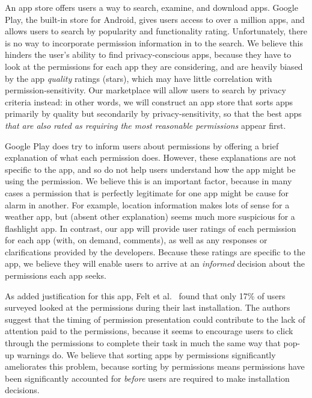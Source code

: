 \documentclass[11pt]{article}
\begin{document}
An app store offers users a way to search, examine, and download
apps.  Google Play, the built-in store for Android, gives
users access to over a million apps, and allows users to search by
popularity and functionality rating. Unfortunately, there is no way to incorporate
permission information in to the search. We believe this hinders the
user's ability to find privacy-conscious apps, because they have to
look at the permissions for each app they are considering, and are
heavily biased by the app \emph{quality} ratings (stars), which may
have little correlation with permission-sensitivity. Our marketplace
will allow users to search by privacy criteria instead: in other
words, we will construct an app store that sorts apps primarily by
quality but secondarily by privacy-sensitivity, so that the best apps
\emph{that are also rated as requiring the most reasonable
  permissions} appear first.

Google Play does try to inform users about permissions by offering a
brief explanation of what each permission does. However, these
explanations are not specific to the app, and so do not help
users understand how the app might be using the permission. We
believe this is an important factor, because in many cases a
permission that is perfectly legitimate for one app might be cause for
alarm in another. For example, location information makes lots of
sense for a weather app, but (absent other explanation) seems much
more suspicious for a flashlight app. In contrast, our app will
provide user ratings of each permission for each app (with, on demand,
comments), as well as any responses or clarifications provided by the
developers. Because these ratings are specific to the app, we believe
they will enable users to arrive at an \emph{informed} decision about
the permissions each app seeks.

As added justification for this app, Felt et al.\ \cite{android-attention-SOUPS12} 
found that only 17\% of users surveyed looked at the permissions during
their last installation. The authors suggest that the timing of
permission presentation could contribute to the lack of attention paid
to the permissions, because it seems to encourage users to click
through the permissions to complete their task in much the same way
that pop-up warnings do. We believe that sorting apps by permissions
significantly ameliorates this problem, because sorting by permissions
means permissions have been significantly accounted for \emph{before}
users are required to make installation decisions.
\end{document}
